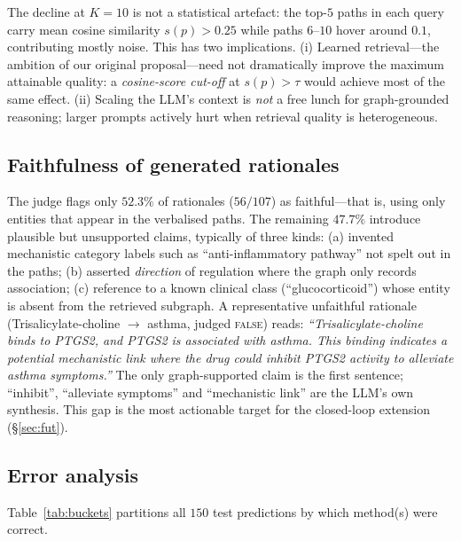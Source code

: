 \documentclass{article}
\begin{document}
The decline at $K{=}10$ is not a statistical artefact: the top-$5$ paths in each query carry mean cosine similarity $s(p){>}0.25$ while paths $6$--$10$ hover around $0.1$, contributing mostly noise. This has two implications. (i) Learned retrieval---the ambition of our original proposal---need not dramatically improve the maximum attainable quality: a \emph{cosine-score cut-off} at $s(p){>}\tau$ would achieve most of the same effect. (ii) Scaling the LLM's context is \emph{not} a free lunch for graph-grounded reasoning; larger prompts actively hurt when retrieval quality is heterogeneous.

\subsection{Faithfulness of generated rationales}
\label{sec:exp:faith}

The judge flags only $52.3\%$ of rationales ($56/107$) as faithful---that is, using only entities that appear in the verbalised paths. The remaining $47.7\%$ introduce plausible but unsupported claims, typically of three kinds: (a) invented mechanistic category labels such as ``anti-inflammatory pathway'' not spelt out in the paths; (b) asserted \emph{direction} of regulation where the graph only records association; (c) reference to a known clinical class (``glucocorticoid'') whose entity is absent from the retrieved subgraph. A representative unfaithful rationale (Trisalicylate-choline $\to$ asthma, judged \textsc{false}) reads: \emph{``Trisalicylate-choline binds to PTGS2, and PTGS2 is associated with asthma. This binding indicates a potential mechanistic link where the drug could inhibit PTGS2 activity to alleviate asthma symptoms.''} The only graph-supported claim is the first sentence; ``inhibit'', ``alleviate symptoms'' and ``mechanistic link'' are the LLM's own synthesis. This gap is the most actionable target for the closed-loop extension (\S\ref{sec:fut}).

\subsection{Error analysis}
\label{sec:exp:errors}

Table~\ref{tab:buckets} partitions all $150$ test predictions by which method(s) were correct.
\end{document}
